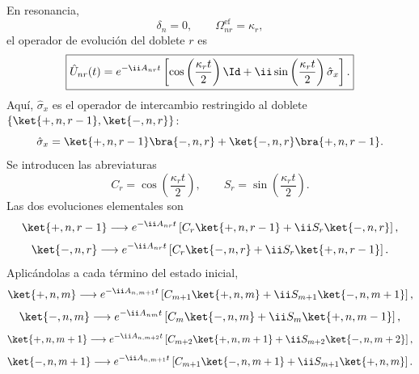 En resonancia,
\begin{equation}
  \delta_n=0,
  \qquad
  \Omega_{nr}^{\mathrm{ef}}=\kappa_r,
\end{equation}
el operador de evoluci\'on del doblete $r$ es
\begin{equation}
  \boxed{
  \hat U_{nr}(t)
  =
  e^{-\ii A_{nr}t}
  \left[
  \cos\left(\frac{\kappa_rt}{2}\right)\Id
  +
  \ii\sin\left(\frac{\kappa_rt}{2}\right)\hat\sigma_x
  \right].
  }
\end{equation}
Aqu\'i, $\hat\sigma_x$ es el operador de intercambio restringido al doblete
$\{\ket{+,n,r-1},\ket{-,n,r}\}$:
\begin{equation}
  \hat\sigma_x
  =
  \ket{+,n,r-1}\bra{-,n,r}
  +
  \ket{-,n,r}\bra{+,n,r-1}.
\end{equation}
Se introducen las abreviaturas
\begin{equation}
  C_r=\cos\left(\frac{\kappa_rt}{2}\right),
  \qquad
  S_r=\sin\left(\frac{\kappa_rt}{2}\right).
\end{equation}
Las dos evoluciones elementales son
\begin{equation}
  \ket{+,n,r-1}
  \longrightarrow
  e^{-\ii A_{nr}t}
  \left[
  C_r\ket{+,n,r-1}
  +\ii S_r\ket{-,n,r}
  \right],
\end{equation}
\begin{equation}
  \ket{-,n,r}
  \longrightarrow
  e^{-\ii A_{nr}t}
  \left[
  C_r\ket{-,n,r}
  +\ii S_r\ket{+,n,r-1}
  \right].
\end{equation}
Aplic\'andolas a cada t\'ermino del estado inicial,
\begin{equation}
  \ket{+,n,m}
  \longrightarrow
  e^{-\ii A_{n,m+1}t}
  \left[
  C_{m+1}\ket{+,n,m}
  +\ii S_{m+1}\ket{-,n,m+1}
  \right],
\end{equation}
\begin{equation}
  \ket{-,n,m}
  \longrightarrow
  e^{-\ii A_{nm}t}
  \left[
  C_m\ket{-,n,m}
  +\ii S_m\ket{+,n,m-1}
  \right],
\end{equation}
\begin{equation}
  \ket{+,n,m+1}
  \longrightarrow
  e^{-\ii A_{n,m+2}t}
  \left[
  C_{m+2}\ket{+,n,m+1}
  +\ii S_{m+2}\ket{-,n,m+2}
  \right],
\end{equation}
\begin{equation}
  \ket{-,n,m+1}
  \longrightarrow
  e^{-\ii A_{n,m+1}t}
  \left[
  C_{m+1}\ket{-,n,m+1}
  +\ii S_{m+1}\ket{+,n,m}
  \right].
\end{equation}

